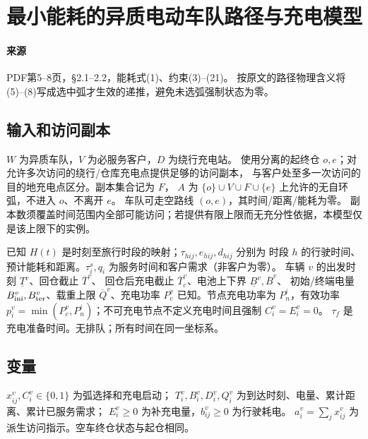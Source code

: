 \documentclass[UTF8,11pt]{ctexart}
\begin{document}
\section*{最小能耗的异质电动车队路径与充电模型}

\paragraph{来源} PDF第5--8页，§2.1--2.2，能耗式(1)、约束(3)--(21)。
按原文的路径物理含义将(5)--(8)写成选中弧才生效的递推，避免未选弧强制状态为零。
\subsection*{输入和访问副本}
$W$ 为异质车队，$V$ 为必服务客户，$D$ 为绕行充电站。
使用分离的起终仓 $o,e$；对允许多次访问的绕行/仓库充电点提供足够的访问副本，
与客户处至多一次访问的目的地充电点区分。副本集合记为 $F$，
$A$ 为 $\{o\}\cup V\cup F\cup\{e\}$ 上允许的无自环弧，不进入 $o$、不离开 $e$。
车队可走空路线 $(o,e)$，其时间/距离/能耗为零。
副本数须覆盖时间范围内全部可能访问；若提供有限上限而无充分性依据，本模型仅是该上限下的实例。

已知 $H(t)$ 是时刻至旅行时段的映射；$\tau_{hij},e_{hij},d_{hij}$ 分别为
时段 $h$ 的行驶时间、预计能耗和距离。$\tau_i^s,q_i$ 为服务时间和客户需求（非客户为零）。
车辆 $v$ 的出发时刻 $\underline T^v$、回仓截止 $\overline T^v$、
回仓后充电截止 $\overline T_c^v$、电池上下界 $\underline B^v,\overline B^v$、
初始/终端电量 $B_{\rm ini}^v,B_{\rm ter}^v$、载重上限 $\overline Q^v$、充电功率
$P_c^v$ 已知。节点充电功率为 $P_n^i$，有效功率
$p_i^v=\min(P_c^v,P_n^i)$；不可充电节点不定义充电时间且强制 $C_i^v=E_i^v=0$。
$\tau_f$ 是充电准备时间。无排队；所有时间在同一坐标系。
\subsection*{变量}
$x_{ij}^v,C_i^v\in\{0,1\}$ 为弧选择和充电启动；
$T_i^v,B_i^v,D_i^v,Q_i^v$ 为到达时刻、电量、累计距离、累计已服务需求；
$E_i^v\ge0$ 为补充电量，$b_{ij}^v\ge0$ 为行驶耗电。
$a_i^v=\sum_jx_{ij}^v$ 为派生访问指示。空车终仓状态与起仓相同。
\end{document}
